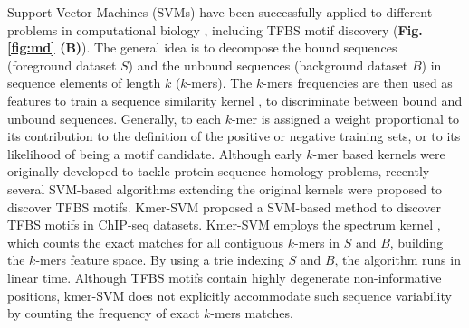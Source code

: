 \documentclass[a4paper, titlepage, 8pt, openright]{book}
\begin{document}
Support Vector Machines (SVMs) \citep{boser1992training} have been successfully applied to different problems in computational biology \citep{ben2008support}, including TFBS motif discovery (\textbf{Fig.\ref{fig:md} (B)}). The general idea is to decompose the bound sequences (foreground dataset $S$) and the unbound sequences (background dataset $B$) in sequence elements of length $k$ ($k$-mers). The $k$-mers frequencies are then used as features to train a sequence similarity kernel \citep{ben2008support}, to discriminate between bound and unbound sequences. Generally, to each $k$-mer is assigned a weight proportional to its contribution to the definition of the positive or negative training sets, or to its likelihood of being a motif candidate. Although early $k$-mer based kernels \citep{leslie2001spectrum,eskin2002mismatch,kuang2005profile} were originally developed to tackle protein sequence homology problems, recently several SVM-based algorithms extending the original kernels were proposed to discover TFBS motifs. Kmer-SVM \citep{lee2011discriminative,fletez2013kmer} proposed a SVM-based method to discover TFBS motifs in ChIP-seq datasets. Kmer-SVM employs the spectrum kernel \citep{leslie2001spectrum}, which counts the exact matches for all contiguous $k$-mers in $S$ and $B$, building the $k$-mers feature space. By using a trie \citep{bodon2003trie} indexing $S$ and $B$, the algorithm runs in linear time. Although TFBS motifs contain highly degenerate non-informative positions, kmer-SVM does not explicitly accommodate such sequence variability by counting the frequency of exact $k$-mers matches. 
\end{document}
